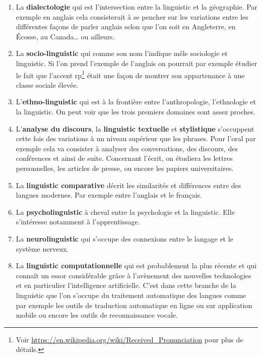 \begin{enumerate}
\item La \textbf{dialectologie} qui est l'intersection entre la
  \gls{linguistic} et la géographie. Par exemple en anglais cela
  consisterait à se pencher sur les variations entre les différentes
  façons de parler anglais selon que l'on soit en Angleterre, en \'Ecosse, au
  Canada\dots{} ou ailleurs.
\item La \textbf{socio-\gls{linguistic}} qui comme son nom l'indique mêle
  sociologie et \gls{linguistic}. Si l'on prend l'exemple de l'anglais
  on pourrait par exemple étudier le fait que l'accent
  \acrfull{rp}\footnote{Voir
    \url{https://en.wikipedia.org/wiki/Received_Pronunciation} pour
    plus de détails.} était une
  façon de montrer son appartenance à une classe sociale élevée.
\item L'\textbf{ethno-\gls{linguistic}} qui est à la frontière entre
  l'anthropologie, l'ethnologie et la \gls{linguistic}. On peut voir que les
  trois premiers domaines sont assez proches.
\item L'\textbf{analyse du discours}, la \textbf{\gls{linguistic}
    textuelle} et \textbf{stylistique} s'occuppent cette fois des
  variations à un niveau supérieur que les phrases. Pour l'oral par
  exemple cela va consister à analyser des conversations, des
  discours, des conférences et ainsi de suite. Concernant l'écrit, on
  étudiera les lettres personnelles, les articles de presse, ou encore
  les papiers universitaires.
\item La \textbf{\gls{linguistic} comparative} décrit les similarités et
  différences entre des langues modernes. Par exemple entre l'anglais
  et le français.
\item La \textbf{psycho\gls{linguistic}} à cheval entre la psychologie et
  la \gls{linguistic}. Elle s'intéresse notamment à l'apprentissage.
\item La \textbf{neuro\gls{linguistic}} qui s'occupe des connexions entre
  le langage et le système nerveux.
\item La \textbf{\gls{linguistic} computationnelle} qui est probablement
  la plus récente et qui connaît un essor considérable grâce à
  l'avènement des nouvelles technologies et en particulier
  l'intelligence artificielle. C'est dans cette branche de la
  \gls{linguistic} que l'on s'occupe du traitement automatique des langues
  comme par exemple les outils de traduction automatique en ligne ou
  sur application mobile ou encore les outils de reconnaissance
  vocale.   
\end{enumerate}

